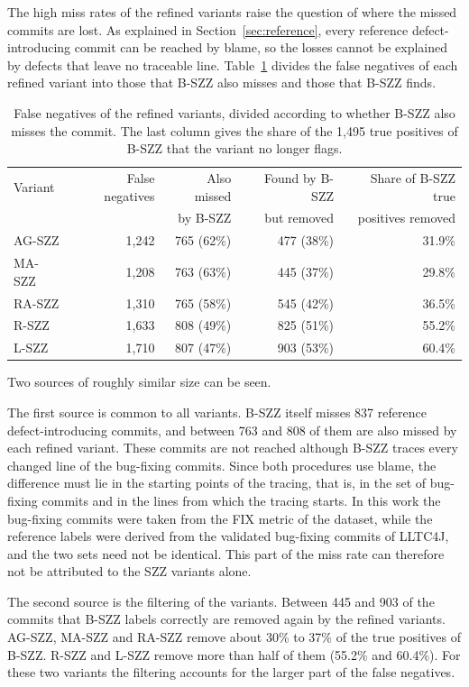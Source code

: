 \documentclass[12pt,a4paper,oneside]{report}
\begin{document}
The high miss rates of the refined variants raise the question of where the
missed commits are lost. As explained in Section~\ref{sec:reference}, every
reference defect-introducing commit can be reached by blame, so the losses
cannot be explained by defects that leave no traceable line.
Table~\ref{tab:fn} divides the false negatives of each refined variant into
those that B-SZZ also misses and those that B-SZZ finds.

\begin{table}[htbp]
\centering\small
\caption{False negatives of the refined variants, divided according to
whether B-SZZ also misses the commit. The last column gives the share of the
1,495 true positives of B-SZZ that the variant no longer flags.}
\label{tab:fn}
\begin{tabular}{@{}lrrrr@{}}
\toprule
Variant & False negatives & Also missed & Found by B-SZZ & Share of B-SZZ true \\
 & & by B-SZZ & but removed & positives removed \\
\midrule
AG-SZZ & 1,242 & 765 (62\%) & 477 (38\%) & 31.9\% \\
MA-SZZ & 1,208 & 763 (63\%) & 445 (37\%) & 29.8\% \\
RA-SZZ & 1,310 & 765 (58\%) & 545 (42\%) & 36.5\% \\
R-SZZ & 1,633 & 808 (49\%) & 825 (51\%) & 55.2\% \\
L-SZZ & 1,710 & 807 (47\%) & 903 (53\%) & 60.4\% \\
\bottomrule
\end{tabular}
\end{table}

Two sources of roughly similar size can be seen.

The first source is common to all variants. B-SZZ itself misses 837 reference
defect-introducing commits, and between 763 and 808 of them are also missed
by each refined variant. These commits are not reached although B-SZZ traces
every changed line of the bug-fixing commits. Since both procedures use
blame, the difference must lie in the starting points of the tracing, that
is, in the set of bug-fixing commits and in the lines from which the tracing
starts. In this work the bug-fixing commits were taken from the FIX metric of
the dataset, while the reference labels were derived from the validated
bug-fixing commits of LLTC4J, and the two sets need not be identical. This
part of the miss rate can therefore not be attributed to the SZZ variants
alone.

The second source is the filtering of the variants. Between 445 and 903 of
the commits that B-SZZ labels correctly are removed again by the refined
variants. AG-SZZ, MA-SZZ and RA-SZZ remove about 30\% to 37\% of the true
positives of B-SZZ. R-SZZ and L-SZZ remove more than half of them (55.2\% and
60.4\%). For these two variants the filtering accounts for the larger part of
the false negatives.
\end{document}
